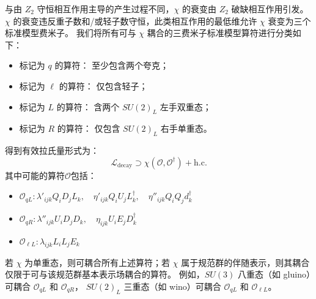 与由 $Z_2$ 守恒相互作用主导的产生过程不同，$\chi$ 的衰变由 $Z_2$ 破缺相互作用引发。
$\chi$ 的衰变违反重子数和/或轻子数守恒，此类相互作用的最低维允许 $\chi$ 衰变为三个标准模型费米子。
我们将所有可与 $\chi$ 耦合的三费米子标准模型算符进行分类如下：
\begin{itemize}
    \item {标记为 $q$ 的算符：} 至少包含两个夸克；
    \item {标记为 $\ell$ 的算符：} 仅包含轻子；
    \item {标记为 $L$ 的算符：} 含两个 $SU(2)_L$ 左手双重态；
    \item {标记为 $R$ 的算符：} 仅包含 $SU(2)_L$ 右手单重态。
\end{itemize}
得到有效拉氏量形式为：
\begin{equation}
    \mathcal{L}_{\text{decay}} \supset \chi (\mathcal{O}, \mathcal{O}^\dagger) + \text{h.c.}
\end{equation}
其中可能的算符$\mathcal{O}$包括：
\begin{itemize}
    \item $\mathcal{O}_{qL}     : \lambda'_{ijk} Q_i D_j L_k,\quad \eta'_{ijk} Q_i U_j L^\dagger_k,\quad \eta''_{ijk} Q_i Q_j d^\dagger_k$
    \item $\mathcal{O}_{qR}     : \lambda''_{ijk} U_i D_j D_k,\quad \eta_{ijk} U_i E_j D^\dagger_k$
    \item $\mathcal{O}_{\ell L} : \lambda_{ijk} L_i L_j E_k$
\end{itemize}

若 $\chi$ 为单重态，则可耦合所有上述算符；若 $\chi$ 属于规范群的伴随表示，则其耦合仅限于可与该规范群基本表示场耦合的算符。
例如，$SU(3)$ 八重态（如 gluino）可耦合 $\mathcal{O}_{qL}$ 和 $\mathcal{O}_{qR}$，
$SU(2)_L$ 三重态（如 wino）可耦合 $\mathcal{O}_{qL}$ 和 $\mathcal{O}_{\ell L}$。
